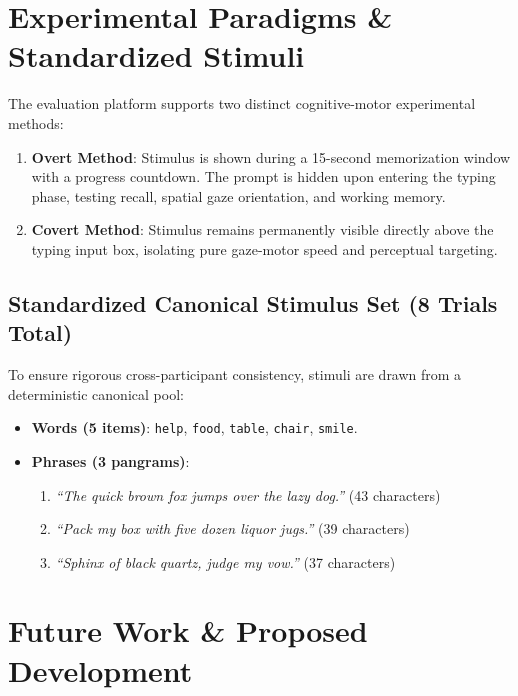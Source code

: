 \documentclass[11pt,a4paper]{article}
\begin{document}
\section{Experimental Paradigms \& Standardized Stimuli}

The evaluation platform supports two distinct cognitive-motor experimental methods:
\begin{enumerate}
    \item \textbf{Overt Method}: Stimulus is shown during a 15-second memorization window with a progress countdown. The prompt is hidden upon entering the typing phase, testing recall, spatial gaze orientation, and working memory.
    \item \textbf{Covert Method}: Stimulus remains permanently visible directly above the typing input box, isolating pure gaze-motor speed and perceptual targeting.
\end{enumerate}

\subsection{Standardized Canonical Stimulus Set (8 Trials Total)}
To ensure rigorous cross-participant consistency, stimuli are drawn from a deterministic canonical pool:
\begin{itemize}
    \item \textbf{Words (5 items)}: \texttt{help}, \texttt{food}, \texttt{table}, \texttt{chair}, \texttt{smile}.
    \item \textbf{Phrases (3 pangrams)}:
    \begin{enumerate}
        \item \emph{``The quick brown fox jumps over the lazy dog.''} (43 characters)
        \item \emph{``Pack my box with five dozen liquor jugs.''} (39 characters)
        \item \emph{``Sphinx of black quartz, judge my vow.''} (37 characters)
    \end{enumerate}
\end{itemize}

\section{Future Work \& Proposed Development}
\end{document}
